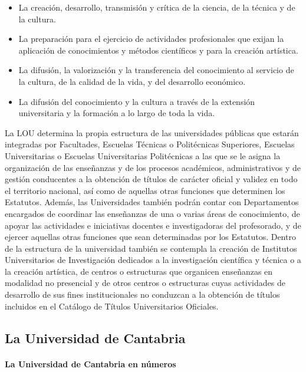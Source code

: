 \begin{itemize}
\itemsep 0mm
\item La creación, desarrollo, transmisión y crítica de la ciencia, de la técnica y de la cultura.  
\item La preparación para el ejercicio de actividades profesionales que exijan la aplicación de conocimientos y métodos científicos y para la creación artística.  
\item La difusión, la valorización y la transferencia del conocimiento al servicio de la cultura, de la calidad de la vida, y del desarrollo económico.  
\item La difusión del conocimiento y la cultura a través de la extensión universitaria y la formación a lo largo de toda la vida. 
\end{itemize}


La LOU determina la propia estructura de las universidades públicas que estarán integradas por Facultades, Escuelas Técnicas o Politécnicas Superiores, Escuelas Universitarias o Escuelas Universitarias Politécnicas a las que se le asigna la organización de las enseñanzas y de los procesos académicos, administrativos y de gestión conducentes a la obtención de títulos de carácter oficial y validez en todo el territorio nacional, así como de aquellas otras funciones que determinen los Estatutos. Además, las Universidades también podrán contar con Departamentos encargados de coordinar las enseñanzas de una o varias áreas de conocimiento, de apoyar las actividades e iniciativas docentes e investigadoras del profesorado, y de ejercer aquellas otras funciones que sean determinadas por los Estatutos. Dentro de la estructura de la universidad también se contempla la creación de Institutos Universitarios de Investigación dedicados a la investigación científica y técnica o a la creación artística, de centros o estructuras que organicen enseñanzas en modalidad no presencial y de otros centros o estructuras cuyas actividades de desarrollo de sus fines institucionales no conduzcan a la obtención de títulos incluidos en el Catálogo de Títulos Universitarios Oficiales. 

\subsection{La Universidad de Cantabria} \label{sec:unican}

\paragraph{La Universidad de Cantabria en números\\\\}

